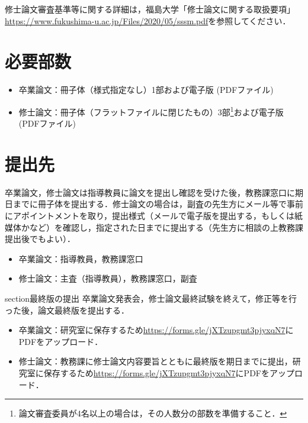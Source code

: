         修士論文審査基準等に関する詳細は，福島大学「修士論文に関する取扱要項」\url{https://www.fukushima-u.ac.jp/Files/2020/05/sssm.pdf}を参照してください．


    \section{必要部数}
        \begin{itemize}
            \item 卒業論文：冊子体（様式指定なし）1部および電子版 (PDFファイル)
            \item 修士論文：冊子体（フラットファイルに閉じたもの）3部\footnote{論文審査委員が4名以上の場合は，その人数分の部数を準備すること．}および電子版 (PDFファイル)
        \end{itemize}

    \section{提出先}
    卒業論文，修士論文は指導教員に論文を提出し確認を受けた後，教務課窓口に期日までに冊子体を提出する．修士論文の場合は，副査の先生方にメール等で事前にアポイントメントを取り，提出様式（メールで電子版を提出する，もしくは紙媒体かなど）を確認し，指定された日までに提出する（先生方に相談の上教務課提出後でもよい）．
        \begin{itemize}
            \item 卒業論文：指導教員，教務課窓口
            \item 修士論文：主査（指導教員），教務課窓口，副査
        \end{itemize}

    section{最終版の提出}
    卒業論文発表会，修士論文最終試験を終えて，修正等を行った後，論文最終版を提出する．
        \begin{itemize}
            \item 卒業論文：研究室に保存するため\url{https://forms.gle/jXTzupgmt3pjyxqN7}にPDFをアップロード．
            \item 修士論文：教務課に修士論文内容要旨とともに最終版を期日までに提出，研究室に保存するため\url{https://forms.gle/jXTzupgmt3pjyxqN7}にPDFをアップロード．
        \end{itemize}
